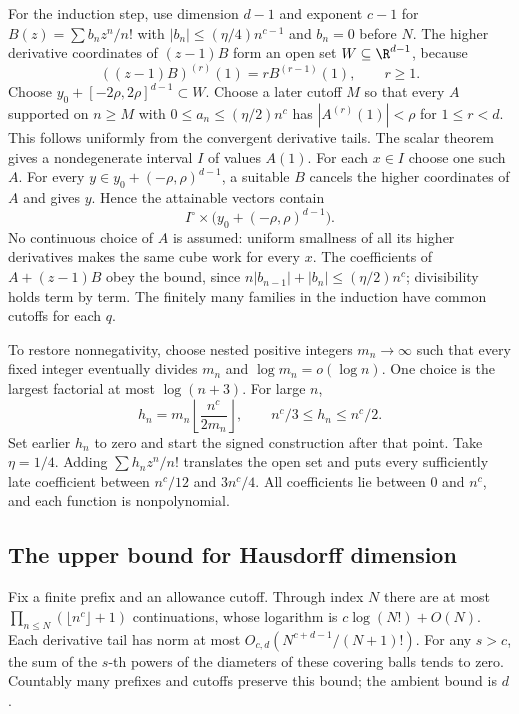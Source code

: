 \documentclass[11pt]{article}
\begin{document}
For the induction step, use dimension $d-1$ and exponent $c-1$ for
$B(z)=\sum b_nz^n/n!$ with $|b_n|\le(\eta/4)n^{c-1}$ and $b_n=0$
before $N$. The higher derivative coordinates of $(z-1)B$ form an open
set $W\subseteq\R^{d-1}$, because
\[
 ((z-1)B)^{(r)}(1)=rB^{(r-1)}(1),\qquad r\ge1.
\]
Choose $y_0+[-2\rho,2\rho]^{d-1}\subset W$. Choose a later cutoff $M$
so that every $A$ supported on $n\ge M$ with
$0\le a_n\le(\eta/2)n^c$ has $|A^{(r)}(1)|<\rho$ for $1\le r<d$.
This follows uniformly from the convergent derivative tails. The scalar
theorem gives a nondegenerate interval $I$ of values $A(1)$.
For each $x\in I$ choose one such $A$. For every
$y\in y_0+(-\rho,\rho)^{d-1}$, a suitable $B$ cancels the higher
coordinates of $A$ and gives $y$. Hence the attainable vectors contain
\[
 I^\circ\times\bigl(y_0+(-\rho,\rho)^{d-1}\bigr).
\]
No continuous choice of $A$ is assumed: uniform smallness of all its higher
derivatives makes the same cube work for every $x$.
The coefficients of $A+(z-1)B$ obey the bound, since
$n|b_{n-1}|+|b_n|\le(\eta/2)n^c$; divisibility holds term by term.
The finitely many families in the induction have common cutoffs for each $q$.

To restore nonnegativity, choose nested positive integers $m_n\to\infty$
such that every fixed integer eventually divides $m_n$ and
$\log m_n=o(\log n)$. One choice is the largest factorial at most
$\log(n+3)$. For large $n$,
\[
 h_n=m_n\left\lfloor\frac{n^c}{2m_n}\right\rfloor,
 \qquad n^c/3\le h_n\le n^c/2.
\]
Set earlier $h_n$ to zero and start the signed construction after that point.
Take $\eta=1/4$. Adding $\sum h_nz^n/n!$ translates the open set and
puts every sufficiently late coefficient between $n^c/12$ and $3n^c/4$.
All coefficients lie between $0$ and $n^c$, and each function is nonpolynomial.

\subsection{The upper bound for Hausdorff dimension}
Fix a finite prefix and an allowance cutoff. Through index $N$ there are
at most $\prod_{n\le N}(\lfloor n^c\rfloor+1)$ continuations, whose
logarithm is $c\log(N!)+O(N)$. Each derivative tail has norm at most
$O_{c,d}(N^{c+d-1}/(N+1)!)$. For any $s>c$, the sum of the $s$-th powers
of the diameters of these covering balls tends to zero. Countably many
prefixes and cutoffs preserve this bound; the ambient bound is $d$.
\end{document}
